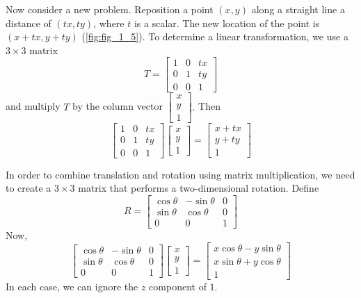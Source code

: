 \documentclass[../main.tex]{subfiles}
\begin{document}
Now consider a new problem. Reposition a point $(x, y)$ along a straight line a distance of $(t x, t y)$, where $t$ is a scalar. The new location of the point is $(x+t x, y+t y)$ (\autoref{fig:fig_1_5}).
To determine a linear transformation, we use a $3 \times 3$ matrix
$$
T=\left[\begin{array}{lll}
1 & 0 & t x \\
0 & 1 & t y \\
0 & 0 & 1
\end{array}\right]
$$
and multiply $T$ by the column vector $\left[\begin{array}{l}x \\ y \\ 1\end{array}\right] .$ Then
$$
\left[\begin{array}{lll}
1 & 0 & t x \\
0 & 1 & t y \\
0 & 0 & 1
\end{array}\right]\left[\begin{array}{l}
x \\
y \\
1
\end{array}\right]=\left[\begin{array}{c}
x+t x \\
y+t y \\
1
\end{array}\right]
$$

In order to combine translation and rotation using matrix multiplication, we need to create a $3 \times 3$ matrix that performs a two-dimensional rotation. Define
$$
R=\left[\begin{array}{ccc}
\cos \theta & -\sin \theta & 0 \\
\sin \theta & \cos \theta & 0 \\
0 & 0 & 1
\end{array}\right]
$$
Now,
$$
\left[\begin{array}{ccc}
\cos \theta & -\sin \theta & 0 \\
\sin \theta & \cos \theta & 0 \\
0 & 0 & 1
\end{array}\right]\left[\begin{array}{l}
x \\
y \\
1
\end{array}\right]=\left[\begin{array}{c}
x \cos \theta-y \sin \theta \\
x \sin \theta+y \cos \theta \\
1
\end{array}\right]
$$
In each case, we can ignore the $z$ component of $1 .$\\
\end{document}
